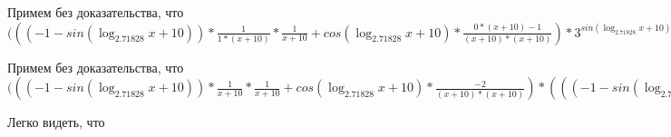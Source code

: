 \documentclass[12pt,a4paper,fleqn]{article}
\theoremstyle{definition}
\begin{document}
Примем без доказательства, что
$((( -1  - sin(\log_{ 2.71828 }{ x  +  10 })) * \frac{ 1 }{ 1  * ( x  +  10 )}
 * \frac{ 1 }{ x  +  10 }
 + cos(\log_{ 2.71828 }{ x  +  10 }) * \frac{ 0  * ( x  +  10 ) -  1 }{( x  +  10 ) * ( x  +  10 )}
) * { 3 }^{sin(\log_{ 2.71828 }{ x  +  10 })} + cos(\log_{ 2.71828 }{ x  +  10 }) * \frac{ 1 }{ x  +  10 }
 *  1  * cos(\log_{ 2.71828 }{ x  +  10 }) * \frac{ 1 }{ 1  * ( x  +  10 )}
 * { 3 }^{sin(\log_{ 2.71828 }{ x  +  10 })} = (( -1  - sin(\log_{ 2.71828 }{ x  +  10 })) * \frac{ 1 }{ 1  * ( x  +  10 )}
 * \frac{ 1 }{ x  +  10 }
 + cos(\log_{ 2.71828 }{ x  +  10 }) * \frac{ 0  * ( x  +  10 ) -  1 }{( x  +  10 ) * ( x  +  10 )}
) * { 3 }^{sin(\log_{ 2.71828 }{ x  +  10 })} + cos(\log_{ 2.71828 }{ x  +  10 }) * \frac{ 1 }{ x  +  10 }
 *  1  * cos(\log_{ 2.71828 }{ x  +  10 }) * \frac{ 1 }{ 1  * ( x  +  10 )}
 * { 3 }^{sin(\log_{ 2.71828 }{ x  +  10 })}$

Примем без доказательства, что
$((( -1  - sin(\log_{ 2.71828 }{ x  +  10 })) * \frac{ 1 }{ x  +  10 }
 * \frac{ 1 }{ x  +  10 }
 + cos(\log_{ 2.71828 }{ x  +  10 }) * \frac{ -2 }{( x  +  10 ) * ( x  +  10 )}
) * ((( -1  - sin(\log_{ 2.71828 }{ x  +  10 })) * \frac{ 1 }{ 1  * ( x  +  10 )}
 * \frac{ 1 }{ x  +  10 }
 + cos(\log_{ 2.71828 }{ x  +  10 }) * \frac{ 0  * ( x  +  10 ) -  1 }{( x  +  10 ) * ( x  +  10 )}
) * { 3 }^{sin(\log_{ 2.71828 }{ x  +  10 })} + cos(\log_{ 2.71828 }{ x  +  10 }) * \frac{ 1 }{ x  +  10 }
 *  1  * cos(\log_{ 2.71828 }{ x  +  10 }) * \frac{ 1 }{ 1  * ( x  +  10 )}
 * { 3 }^{sin(\log_{ 2.71828 }{ x  +  10 })}) = (( -1  - sin(\log_{ 2.71828 }{ x  +  10 })) * \frac{ 1 }{ x  +  10 }
 * \frac{ 1 }{ x  +  10 }
 + cos(\log_{ 2.71828 }{ x  +  10 }) * \frac{ -2 }{( x  +  10 ) * ( x  +  10 )}
) * ((( -1  - sin(\log_{ 2.71828 }{ x  +  10 })) * \frac{ 1 }{ 1  * ( x  +  10 )}
 * \frac{ 1 }{ x  +  10 }
 + cos(\log_{ 2.71828 }{ x  +  10 }) * \frac{ 0  * ( x  +  10 ) -  1 }{( x  +  10 ) * ( x  +  10 )}
) * { 3 }^{sin(\log_{ 2.71828 }{ x  +  10 })} + cos(\log_{ 2.71828 }{ x  +  10 }) * \frac{ 1 }{ x  +  10 }
 *  1  * cos(\log_{ 2.71828 }{ x  +  10 }) * \frac{ 1 }{ 1  * ( x  +  10 )}
 * { 3 }^{sin(\log_{ 2.71828 }{ x  +  10 })})$

Легко видеть, что
\end{document}
